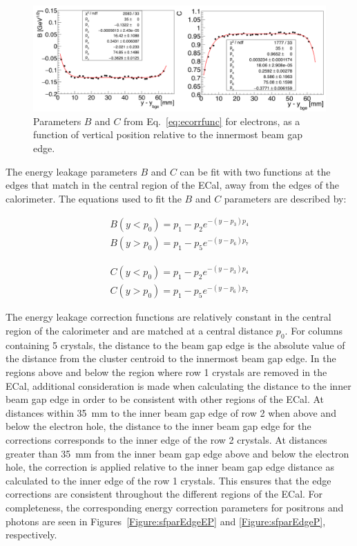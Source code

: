\begin{figure}[htb]
  \centering
      \includegraphics[width=1.0\textwidth]{pics/performance/sfparEdgeFit.png}
  \caption[ECal energy shower parameters for electrons relative to the inside beam gap edge]{Parameters $B$ and $C$ from Eq.~\ref{eq:ecorrfunc} for electrons, as a function of vertical position
relative to the innermost beam gap edge.}
  \label{Figure:sfparEdge}
\end{figure}
The energy leakage parameters $B$ and $C$ can be fit with two functions at the edges that match in the central region of the ECal, away from the edges of the calorimeter. The equations used to fit the $B$ and $C$ parameters are described by:

\begin{equation}
\begin{split}
\label{eq:p1parlt}
B(y<p_0) = p_1-p_2 e^{-(y-p_3)p_4}\\
B(y>p_0) = p_1-p_5 e^{-(y-p_6)p_7}
\end{split}
\end{equation}

\begin{equation}
\begin{split}
\label{eq:p2parlt}
C(y<p_0) = p_1-p_2 e^{-(y-p_3)p_4}\\
C(y>p_0) = p_1-p_5 e^{-(y-p_6)p_7}
\end{split}
\end{equation}

The energy leakage correction functions are relatively constant in the central region of the calorimeter and are matched at a central distance $p_0$. For columns containing 5 crystals, the distance to the beam gap edge is the absolute value of the distance from the cluster centroid to the innermost beam gap edge. In the regions above and below the region where row 1 crystals are removed in the ECal, additional consideration is made when calculating the distance to the inner beam gap edge in order to be consistent with other regions of the ECal. At distances within 35~mm to the inner beam gap edge of row 2 when above and below the electron hole, the distance to the inner beam gap edge for the corrections corresponds to the inner edge of the row 2 crystals. At distances greater than 35~mm from the inner beam gap edge above and below the electron hole, the correction is applied relative to the inner beam gap edge distance as calculated to the inner edge of the row 1 crystals. This ensures that the edge corrections are consistent throughout the different regions of the ECal. For completeness, the corresponding energy correction parameters for positrons and photons are seen in Figures~\ref{Figure:sfparEdgeEP} and \ref{Figure:sfparEdgeP}, respectively. 

